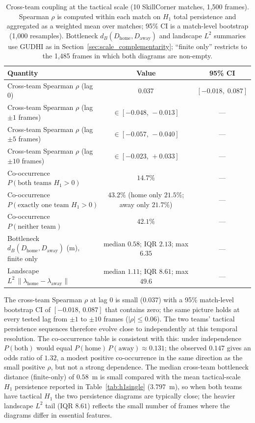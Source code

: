 \begin{table}[H]
  \centering
  \caption{Cross-team coupling at the tactical scale (10 SkillCorner matches, 1{,}500 frames). Spearman \(\rho\) is computed within each match on \(H_1\) total persistence and aggregated as a weighted mean over matches; 95\% CI is a match-level bootstrap (1{,}000 resamples). Bottleneck \(d_B(D_\mathrm{home}, D_\mathrm{away})\) and landscape \(L^2\) summaries use GUDHI as in Section~\ref{sec:scale_complementarity}; ``finite only'' restricts to the 1{,}485 frames in which both diagrams are non-empty.}
  \label{tab:bilateral_coupling}
  \begin{tabular}{@{}lcc@{}}
      \toprule
      Quantity & Value & 95\% CI \\
      \midrule
      Cross-team Spearman \(\rho\) (lag 0)         & \(0.037\)  & \([-0.018,\;0.087]\) \\
      Cross-team Spearman \(\rho\) (lag \(\pm 1\) frames)  & \(\in[-0.048,\,-0.013]\)  & --- \\
      Cross-team Spearman \(\rho\) (lag \(\pm 5\) frames)  & \(\in[-0.057,\,-0.040]\)  & --- \\
      Cross-team Spearman \(\rho\) (lag \(\pm 10\) frames) & \(\in[-0.023,\,+0.033]\)  & --- \\
      Co-occurrence \(P(\text{both teams } H_1>0)\) & \(14.7\%\) & --- \\
      Co-occurrence \(P(\text{exactly one team } H_1>0)\) & \(43.2\%\) (home only \(21.5\%\); away only \(21.7\%\)) & --- \\
      Co-occurrence \(P(\text{neither team})\) & \(42.1\%\) & --- \\
      \midrule
      Bottleneck \(d_B(D_\mathrm{home}, D_\mathrm{away})\) (m), finite only & median \(0.58\); IQR \(2.13\); max \(6.35\)  & --- \\
      Landscape \(L^2\,\|\lambda_\mathrm{home}-\lambda_\mathrm{away}\|\)  & median \(1.11\); IQR \(8.61\); max \(49.6\) & --- \\
      \bottomrule
  \end{tabular}
\end{table}

The cross-team Spearman \(\rho\) at lag 0 is small (\(0.037\)) with a 95\% match-level bootstrap CI of \([-0.018,\,0.087]\) that contains zero; the same picture holds at every tested lag from \(\pm 1\) to \(\pm 10\) frames (\(|\rho|\leq 0.06\)). The two teams' tactical persistence sequences therefore evolve close to independently at this temporal resolution. The co-occurrence table is consistent with this: under independence \(P(\text{both})\) would equal \(P(\text{home})\,P(\text{away})\approx 0.131\); the observed \(0.147\) gives an odds ratio of \(1.32\), a modest positive co-occurrence in the same direction as the small positive \(\rho\), but not a strong dependence. The median cross-team bottleneck distance (finite-only) of \(0.58\)~m is small compared with the mean tactical-scale \(H_1\) persistence reported in Table~\ref{tab:h1single} (\(3.797\)~m), so when both teams have tactical \(H_1\) the two persistence diagrams are typically close; the heavier landscape \(L^2\) tail (IQR \(8.61\)) reflects the small number of frames where the diagrams differ in essential features.

